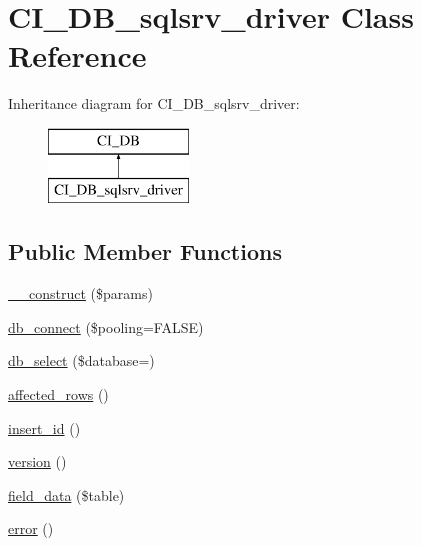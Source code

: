 \hypertarget{class_c_i___d_b__sqlsrv__driver}{}\section{C\+I\+\_\+\+D\+B\+\_\+sqlsrv\+\_\+driver Class Reference}
\label{class_c_i___d_b__sqlsrv__driver}
Inheritance diagram for C\+I\+\_\+\+D\+B\+\_\+sqlsrv\+\_\+driver\+:\begin{figure}[H]
\begin{center}
\leavevmode
\includegraphics[height=2.000000cm]{class_c_i___d_b__sqlsrv__driver}
\end{center}
\end{figure}
\subsection*{Public Member Functions}
\begin{DoxyCompactItemize}
\item 
\mbox{\hyperlink{class_c_i___d_b__sqlsrv__driver_a9162320adff1a1a4afd7f2372f753a3e}{\+\_\+\+\_\+construct}} (\$params)
\item 
\mbox{\hyperlink{class_c_i___d_b__sqlsrv__driver_a6d26c8c9642181bd1124a45342f669f7}{db\+\_\+connect}} (\$pooling=F\+A\+L\+SE)
\item 
\mbox{\hyperlink{class_c_i___d_b__sqlsrv__driver_a18ae9c21870b30b45337c5e3626190cc}{db\+\_\+select}} (\$database=\textquotesingle{}\textquotesingle{})
\item 
\mbox{\hyperlink{class_c_i___d_b__sqlsrv__driver_a77248aaad33eb132c04cc4aa3f4bc8cb}{affected\+\_\+rows}} ()
\item 
\mbox{\hyperlink{class_c_i___d_b__sqlsrv__driver_a933f2cde8dc7f87875e257d0a4902e99}{insert\+\_\+id}} ()
\item 
\mbox{\hyperlink{class_c_i___d_b__sqlsrv__driver_a6080dae0886626b9a4cedb29240708b1}{version}} ()
\item 
\mbox{\hyperlink{class_c_i___d_b__sqlsrv__driver_a90355121e1ed009e0efdbd544ab56efa}{field\+\_\+data}} (\$table)
\item 
\mbox{\hyperlink{class_c_i___d_b__sqlsrv__driver_a43b8d30b879d4f09ceb059b02af2bc02}{error}} ()
\end{DoxyCompactItemize}
